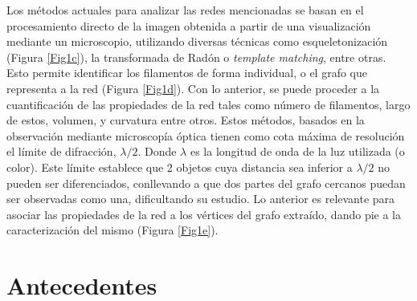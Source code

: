 \documentclass{article}
\begin{document}
\vspace{.5cm}
Los m\'etodos actuales para analizar las redes mencionadas se basan en el procesamiento directo de la imagen obtenida a partir de una visualizaci\'on mediante un microscopio, utilizando diversas t\'ecnicas como esqueletonizaci\'on (Figura \ref{Fig1c}), la transformada de Rad\'on o {\it template matching}, entre otras. Esto permite identificar los filamentos de forma individual, o el grafo que representa a la red (Figura \ref{Fig1d}).
Con lo anterior, se puede proceder a la cuantificaci\'on de las propiedades de la red tales como n\'umero de filamentos, largo de estos, volumen, y curvatura entre otros. Estos m\'etodos, basados en la observaci\'on mediante microscop\'ia \'optica tienen como cota m\'axima de resoluci\'on el l\'imite de difracci\'on, $\lambda/2$. Donde $\lambda$ es la longitud de onda de la luz utilizada (o color). Este l\'imite establece que 2 objetos cuya distancia sea inferior a $\lambda/2$ no pueden ser diferenciados, conllevando a que dos partes del grafo cercanos puedan ser observadas como una, dificultando su estudio. Lo anterior es relevante para asociar las propiedades de la red a los v\'ertices del grafo extra\'ido, dando pie a la caracterizaci\'on del mismo (Figura \ref{Fig1e}).
\section{Antecedentes}

\end{document}
